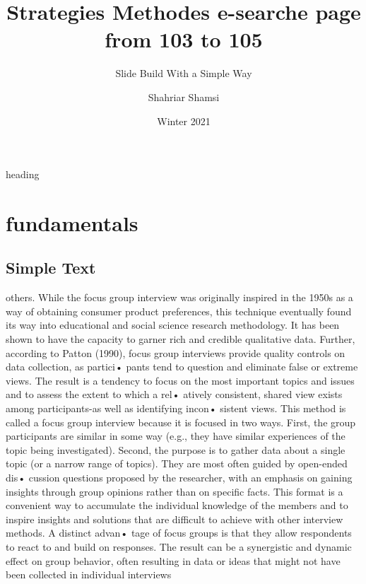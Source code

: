 \documentclass{beamer}
\title{Strategies Methodes e-searche page from 103 to 105}
\subtitle{Slide Build With a Simple Way‌}
\author{Shahriar Shamsi }
\institute{Payam Nour University}
\date{Winter 2021}
\begin{document}
\begin{frame}
\maketitle
\end{frame}

\everypar{\rightskip\rightmargin}
\begin{frame}{heading}
\section{fundamentals}
\subsection{Simple Text}
others. While the focus group interview was originally inspired in the 1950s
as a way of obtaining consumer product preferences, this technique eventually
found its way into educational and social science research methodology.
It has been shown to have the capacity to garner rich and credible qualitative
data. Further, according to Patton (1990), focus group interviews
provide quality controls on data collection, as partici• pants tend to question
and eliminate false or extreme views. The result is a tendency to focus
on the most important topics and issues and to assess the extent to which
a rel• atively consistent, shared view exists among participants-as well as
identifying incon• sistent views. This method is called a focus group interview
because it is focused in two ways. First, the group participants are
similar in some way (e.g., they have similar experiences of the topic being
investigated). Second, the purpose is to gather data about a single topic
(or a narrow range of topics). They are most often guided by open-ended
dis• cussion questions proposed by the researcher, with an emphasis on
gaining insights through group opinions rather than on specific facts. This
format is a convenient way to accumulate the individual knowledge of the
members and to inspire insights and solutions that are difficult to achieve
with other interview methods. A distinct advan• tage of focus groups is
that they allow respondents to react to and build on responses. The result
can be a synergistic and dynamic effect on group behavior, often resulting
in data or ideas that might not have been collected in individual interviews
\end{frame}
\end{document}
